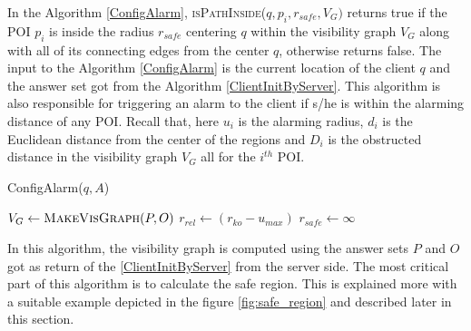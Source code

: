 \documentclass{sig-alternate}
\begin{document}
In the Algorithm \ref{ConfigAlarm}, \textsc{isPathInside}($q, p_i, r_{safe}, V_G)$ returns true if the POI $p_i$ is inside the radius $r_{safe}$ centering $q$ within the visibility graph $V_G$ along with all of its connecting edges from the center $q$, otherwise returns false.
The input to the Algorithm \ref{ConfigAlarm} is the current location of the client $q$ and the answer set got from the Algorithm \ref{ClientInitByServer}. This algorithm is also responsible for triggering an alarm to the client if s/he is within the alarming distance of any POI. Recall that, here $u_i$ is the alarming radius, $d_i$ is the Euclidean distance from the center of the regions and $D_i$ is the obstructed distance in the visibility graph $V_G$ all for the $i^{th}$ POI.
\begin{algorithm}
\caption{ConfigAlarm($q, A$)}
\label{ConfigAlarm}

    
     $V_G \gets \textsc{MakeVisGraph}(P, O)$ \;
     $r_{rel} \gets (r_{ko} - u_{max})$ \;
     $r_{safe} \gets \infty$ \;
    
    

\end{algorithm}

In this algorithm, the visibility graph is computed using the answer sets $P$ and $O$ got as return of the \ref{ClientInitByServer} from the server side. The most critical part of this algorithm is to calculate the safe region. This is explained more with a suitable example depicted in the figure \ref{fig:safe_region} and described later in this section.
\end{document}
